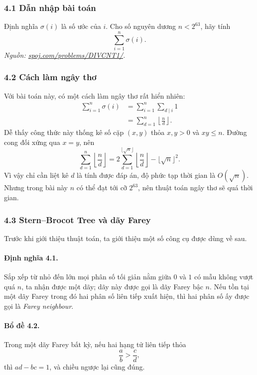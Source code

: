 \documentclass[11pt]{article}
\begin{document}
\subsubsection*{4.1 Dẫn nhập bài toán}

Định nghĩa \(\sigma(i)\) là số ước của \(i\). Cho số nguyên dương \(n<2^{63}\),
hãy tính
\[
  \sum_{i=1}^{n}\sigma(i).
\]
\emph{Nguồn: \url{spoj.com/problems/DIVCNT1/}.}

\subsubsection*{4.2 Cách làm ngây thơ}

Với bài toán này, có một cách làm ngây thơ rất hiển nhiên:
\[
\begin{aligned}
  \sum_{i=1}^{n}\sigma(i)
  &=\sum_{i=1}^{n}\sum_{d\mid i}1\\
  &=\sum_{d=1}^{n}\left\lfloor\frac{n}{d}\right\rfloor.
\end{aligned}
\]
Dễ thấy công thức này thống kê số cặp \((x,y)\) thỏa \(x,y>0\) và \(xy\le n\).
Đường cong đối xứng qua \(x=y\), nên
\[
  \sum_{d=1}^{n}\left\lfloor\frac{n}{d}\right\rfloor
  =
  2\sum_{d=1}^{\lfloor\sqrt n\rfloor}
  \left\lfloor\frac{n}{d}\right\rfloor
  -\lfloor\sqrt n\rfloor^2.
\]
Vì vậy chỉ cần liệt kê \(d\) là tính được đáp án, độ phức tạp thời gian là
\(O(\sqrt n)\). Nhưng trong bài này \(n\) có thể đạt tới cỡ \(2^{63}\), nên
thuật toán ngây thơ sẽ quá thời gian.

\subsubsection*{4.3 Stern--Brocot Tree và dãy Farey}

Trước khi giới thiệu thuật toán, ta giới thiệu một số công cụ được dùng về sau.

\paragraph{Định nghĩa 4.1.}
Sắp xếp từ nhỏ đến lớn mọi phân số tối giản nằm giữa \(0\) và \(1\) có mẫu
không vượt quá \(n\), ta nhận được một dãy; dãy này được gọi là dãy Farey bậc
\(n\). Nếu tồn tại một dãy Farey trong đó hai phân số liên tiếp xuất hiện, thì
hai phân số ấy được gọi là \emph{Farey neighbour}.

\paragraph{Bổ đề 4.2.}
Trong một dãy Farey bất kỳ, nếu hai hạng tử liên tiếp thỏa
\[
  \frac{a}{b}>\frac{c}{d},
\]
thì \(ad-bc=1\), và chiều ngược lại cũng đúng.
\end{document}
